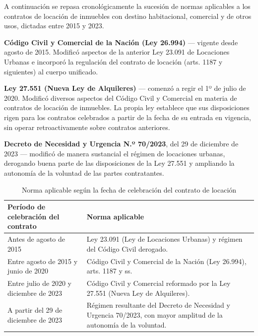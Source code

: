 \documentclass[12pt,oneside]{book}
\begin{document}
A continuación se repasa cronológicamente la sucesión de normas aplicables a los contratos de locación de inmuebles con destino habitacional, comercial y de otros usos, dictadas entre 2015 y 2023.

\begin{normacitada}
\textbf{Código Civil y Comercial de la Nación (Ley 26.994)} --- vigente desde agosto de 2015. Modificó aspectos de la anterior Ley 23.091 de Locaciones Urbanas e incorporó la regulación del contrato de locación (arts. 1187 y siguientes) al cuerpo unificado.
\end{normacitada}

\begin{normacitada}
\textbf{Ley 27.551 (Nueva Ley de Alquileres)} --- comenzó a regir el 1º de julio de 2020. Modificó diversos aspectos del Código Civil y Comercial en materia de contratos de locación de inmuebles. La propia ley establece que sus disposiciones rigen para los contratos celebrados a partir de la fecha de su entrada en vigencia, sin operar retroactivamente sobre contratos anteriores.
\end{normacitada}

\begin{normacitada}
\textbf{Decreto de Necesidad y Urgencia N.º 70/2023}, del 29 de diciembre de 2023 --- modificó de manera sustancial el régimen de locaciones urbanas, derogando buena parte de las disposiciones de la Ley 27.551 y ampliando la autonomía de la voluntad de las partes contratantes.
\end{normacitada}

\begin{table}[H]
\centering
\caption{Norma aplicable según la fecha de celebración del contrato de locación}
\begin{tabularx}{\textwidth}{>{\raggedright\arraybackslash}p{} X}
\toprule
\textbf{Período de celebración del contrato} & \textbf{Norma aplicable} \\
\midrule
Antes de agosto de 2015 & Ley 23.091 (Ley de Locaciones Urbanas) y régimen del Código Civil derogado. \\
Entre agosto de 2015 y junio de 2020 & Código Civil y Comercial de la Nación (Ley 26.994), arts. 1187 y ss. \\
Entre julio de 2020 y diciembre de 2023 & Código Civil y Comercial reformado por la Ley 27.551 (Nueva Ley de Alquileres). \\
A partir del 29 de diciembre de 2023 & Régimen resultante del Decreto de Necesidad y Urgencia 70/2023, con mayor amplitud de la autonomía de la voluntad. \\
\bottomrule
\end{tabularx}
\end{table}
\end{document}
